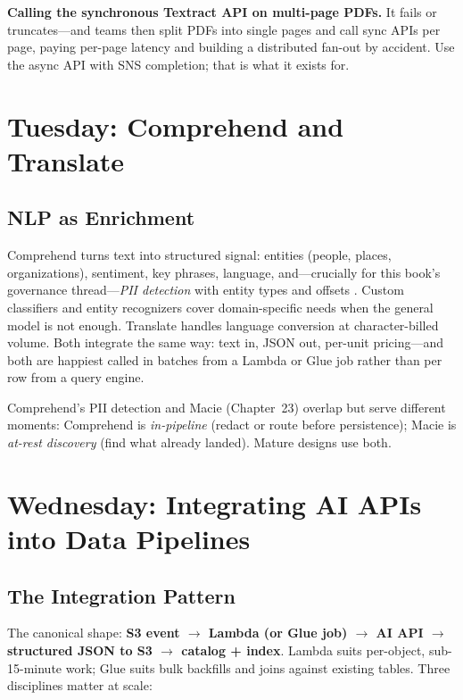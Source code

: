 \begin{pitfall}
\textbf{Calling the synchronous Textract API on multi-page PDFs.} It fails or truncates---and teams then split PDFs into single pages and call sync APIs per page, paying per-page latency and building a distributed fan-out by accident. Use the async API with SNS completion; that is what it exists for.
\end{pitfall}

\section{Tuesday: Comprehend and Translate}
\subsection{NLP as Enrichment}
Comprehend turns text into structured signal: entities (people, places, organizations), sentiment, key phrases, language, and---crucially for this book's governance thread---\emph{PII detection} with entity types and offsets \cite{awsComprehendDocs}. Custom classifiers and entity recognizers cover domain-specific needs when the general model is not enough. Translate handles language conversion at character-billed volume. Both integrate the same way: text in, JSON out, per-unit pricing---and both are happiest called in batches from a Lambda or Glue job rather than per row from a query engine.

\begin{tipbox}
Comprehend's PII detection and Macie (Chapter~23) overlap but serve different moments: Comprehend is \emph{in-pipeline} (redact or route before persistence); Macie is \emph{at-rest discovery} (find what already landed). Mature designs use both.
\end{tipbox}

\section{Wednesday: Integrating AI APIs into Data Pipelines}
\subsection{The Integration Pattern}
The canonical shape: \textbf{S3 event $\rightarrow$ Lambda (or Glue job) $\rightarrow$ AI API $\rightarrow$ structured JSON to S3 $\rightarrow$ catalog + index}. Lambda suits per-object, sub-15-minute work; Glue suits bulk backfills and joins against existing tables. Three disciplines matter at scale:

